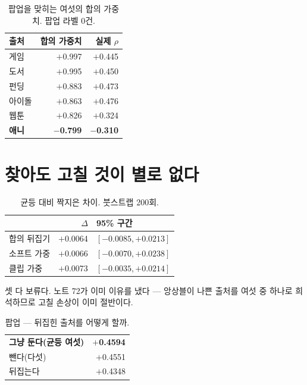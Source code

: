 \documentclass[10pt]{article}
\begin{document}
\begin{table}[t]
\centering\tsize
\caption{팝업을 맞히는 여섯의 합의 가중치. 팝업 라벨 0건.}
\begin{tabular}{lrr}
\toprule
출처 & 합의 가중치 & 실제 $\rho$ \\
\midrule
게임 & $+$0.997 & $+$0.445 \\
도서 & $+$0.995 & $+$0.450 \\
펀딩 & $+$0.883 & $+$0.473 \\
아이돌 & $+$0.863 & $+$0.476 \\
웹툰 & $+$0.826 & $+$0.324 \\
\textbf{애니} & \textbf{$-$0.799} & \textbf{$-$0.310} \\
\bottomrule
\end{tabular}
\end{table}


\section{찾아도 고칠 것이 별로 없다}

\begin{table}[t]
\centering\tsize
\caption{균등 대비 짝지은 차이. 붓스트랩 200회.}
\begin{tabular}{lrl}
\toprule
& $\Delta$ & 95\% 구간 \\
\midrule
합의 뒤집기 & $+$0.0064 & $[-0.0085, +0.0213]$ \\
소프트 가중 & $+$0.0066 & $[-0.0070, +0.0238]$ \\
클립 가중 & $+$0.0073 & $[-0.0035, +0.0214]$ \\
\bottomrule
\end{tabular}
\end{table}

셋 다 보류다. 노트 72가 이미 이유를 냈다 --- 앙상블이 나쁜 출처를 여섯 중
하나로 희석하므로 고칠 손상이 이미 절반이다.

\begin{table}[t]
\centering\tsize
\caption{팝업 --- 뒤집힌 출처를 어떻게 할까.}
\begin{tabular}{lr}
\toprule
\textbf{그냥 둔다(균등 여섯)} & \textbf{$+$0.4594} \\
뺀다(다섯) & $+$0.4551 \\
뒤집는다 & $+$0.4348 \\
\bottomrule
\end{tabular}
\end{table}
\end{document}
